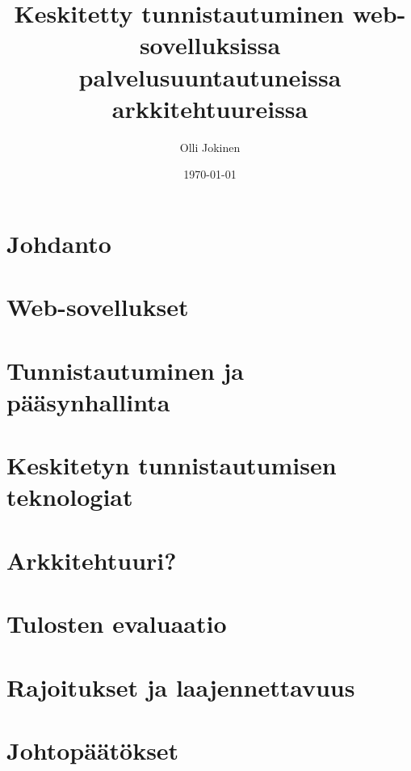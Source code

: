 \documentclass{tktltiki}
\begin{document}
\title{Keskitetty tunnistautuminen web-sovelluksissa palvelusuuntautuneissa arkkitehtuureissa}
\author{Olli Jokinen}
\date{\today}
\maketitle
\doublespacing
{}
\subject{Tietojenkäsittelytiede}
\additionalinformation{}
\begin{abstract}

\end{abstract}
\mytableofcontents
\section{Johdanto}

\section{Web-sovellukset}

\section{Tunnistautuminen ja pääsynhallinta}

\section{Keskitetyn tunnistautumisen teknologiat}

\section{Arkkitehtuuri?}

\section{Tulosten evaluaatio}

\section{Rajoitukset ja laajennettavuus}

\section{Johtopäätökset}

\newpage


\lastpage
\end{document}
